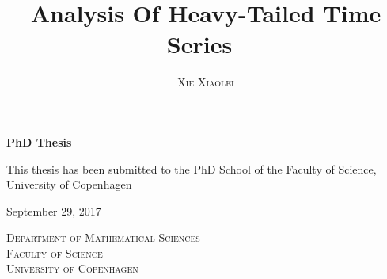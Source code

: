 

\title{\textbf{\HUGE Analysis Of Heavy-Tailed Time Series\ \\ \vspace{1.5em}}}	
\author{\Huge \textsc{Xie Xiaolei}}
\date{}
\maketitle
\thispagestyle{empty}
\begin{center}
\LARGE
\Huge\textbf{PhD Thesis}

\vspace{7em}
\LARGE
This thesis has been submitted to the PhD School of the Faculty of Science, University of Copenhagen

\vspace{2em}

September 29, 2017

\vspace{2em}

\textsc{Department of Mathematical Sciences \\ Faculty of Science \\ University of Copenhagen}
\end{center}

